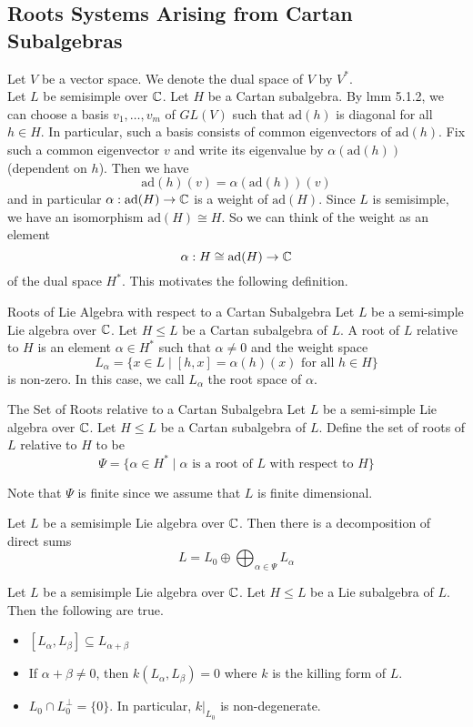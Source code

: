 \documentclass[a4paper]{article}
\begin{document}
\subsection{Roots Systems Arising from Cartan Subalgebras}
Let $V$ be a vector space. We denote the dual space of $V$ by $V^\ast$. \\

Let $L$ be semisimple over $\mathbb{C}$. Let $H$ be a Cartan subalgebra. By lmm 5.1.2, we can choose a basis $v_1,\dots,v_m$ of $GL(V)$ such that $\text{ad}(h)$ is diagonal for all $h\in H$. In particular, such a basis consists of common eigenvectors of $\text{ad}(h)$. Fix such a common eigenvector $v$ and write its eigenvalue by $\alpha(\text{ad}(h))$ (dependent on $h$). Then we have $$\text{ad}(h)(v)=\alpha(\text{ad}(h))(v)$$ and in particular $\alpha:\text{ad}(H)\to\mathbb{C}$ is a weight of $\text{ad}(H)$. Since $L$ is semisimple, we have an isomorphism $\text{ad}(H)\cong H$. So we can think of the weight as an element $$\alpha:H\cong\text{ad}(H)\to\mathbb{C}$$ of the dual space $H^\ast$. This motivates the following definition. 

\begin{defn}{Roots of Lie Algebra with respect to a Cartan Subalgebra}{} Let $L$ be a semi-simple Lie algebra over $\mathbb{C}$. Let $H\leq L$ be a Cartan subalgebra of $L$. A root of $L$ relative to $H$ is an element $\alpha\in H^\ast$ such that $\alpha\neq 0$ and the weight space $$L_\alpha=\{x\in L\;|\;[h,x]=\alpha(h)(x)\text{ for all }h\in H\}$$ is non-zero. In this case, we call $L_\alpha$ the root space of $\alpha$. 
\end{defn}

\begin{defn}{The Set of Roots relative to a Cartan Subalgebra}{} Let $L$ be a semi-simple Lie algebra over $\mathbb{C}$. Let $H\leq L$ be a Cartan subalgebra of $L$. Define the set of roots of $L$ relative to $H$ to be $$\Psi=\{\alpha\in H^\ast\;|\;\alpha\text{ is a root of }L\text{ with respect to }H\}$$
\end{defn}

Note that $\Psi$ is finite since we assume that $L$ is finite dimensional. 

\begin{lmm}{}{} Let $L$ be a semisimple Lie algebra over $\mathbb{C}$. Then there is a decomposition of direct sums $$L=L_0\oplus\bigoplus_{\alpha\in\Psi}L_\alpha$$
\end{lmm}

\begin{prp}{}{} Let $L$ be a semisimple Lie algebra over $\mathbb{C}$. Let $H\leq L$ be a Lie subalgebra of $L$. Then the following are true. 
\begin{itemize}
\item $[L_\alpha,L_\beta]\subseteq L_{\alpha+\beta}$
\item If $\alpha+\beta\neq 0$, then $k(L_\alpha,L_\beta)=0$ where $k$ is the killing form of $L$. 
\item $L_0\cap L_0^\perp=\{0\}$. In particular, $k|_{L_0}$ is non-degenerate. 
\end{itemize}
\end{prp}
\end{document}
